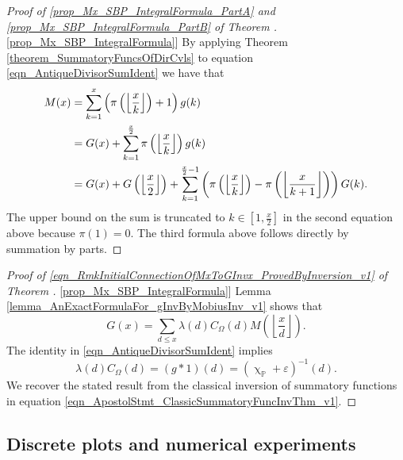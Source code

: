 \documentclass[11pt,reqno,a4letter]{article}
\newcommand{\hlocalref}[1]{\hyperref[#1]{\ref{#1}}}
\numberwithin{equation}{section}
\numberwithin{figure}{section}
\numberwithin{table}{section}
\renewcommand{\chi}{\upchi}
\newcommand{\Floor}[2]{\ensuremath{\left\lfloor \frac{#1}{#2} \right\rfloor}}
\theoremstyle{plain}
\numberwithin{theorem}{section}
\theoremstyle{definition}
\theoremstyle{remark}
\begin{document}
\begin{proof}[Proof of 
              \eqref{prop_Mx_SBP_IntegralFormula_PartA} and \eqref{prop_Mx_SBP_IntegralFormula_PartB} of 
              Theorem \hlocalref{prop_Mx_SBP_IntegralFormula}] 
By applying Theorem \hlocalref{theorem_SummatoryFuncsOfDirCvls} to 
equation \eqref{eqn_AntiqueDivisorSumIdent} we have that 
\begin{align} 
\notag
M(x) & = \sum_{k=1}^{x} \left(\pi\left(\Floor{x}{k}\right)+1\right) g(k) \\ 
\notag 
     & = G(x) + \sum_{k=1}^{\frac{x}{2}} \pi\left(\Floor{x}{k}\right) g(k) \\ 
\notag 
     & = G(x) + G\left(\Floor{x}{2}\right) + 
     \sum_{k=1}^{\frac{x}{2}-1} \left( 
     \pi\left(\Floor{x}{k}\right) - \pi\left(\Floor{x}{k+1}\right) 
	\right) G(k).
\end{align} 
The upper bound on the sum is truncated to $k \in \left[1, \frac{x}{2}\right]$ in the second equation 
above because $\pi(1) = 0$. 
The third formula above follows directly by summation by parts. 
\end{proof} 
\begin{proof}[Proof of \eqref{eqn_RmkInitialConnectionOfMxToGInvx_ProvedByInversion_v1} of 
	      Theorem \hlocalref{prop_Mx_SBP_IntegralFormula}]
Lemma \hlocalref{lemma_AnExactFormulaFor_gInvByMobiusInv_v1} shows that 
\[
G(x) = \sum_{d \leq x} \lambda(d) C_{\Omega}(d) M\left(\Floor{x}{d}\right). 
\]
The identity in \eqref{eqn_AntiqueDivisorSumIdent} implies 
$$\lambda(d) C_{\Omega}(d) = (g \ast 1)(d) = (\chi_{\mathbb{P}} + \varepsilon)^{-1}(d).$$ 
We recover the stated result from the classical inversion of summatory functions in 
equation \eqref{eqn_ApostolStmt_ClassicSummatoryFuncInvThm_v1}. 
\end{proof}

\subsection{Discrete plots and numerical experiments}
\end{document}

